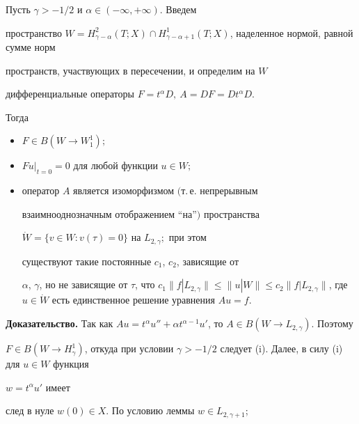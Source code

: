 \begin{lems}\label{AF}


Пусть $\gamma > -1/2$ и $\alpha \in (-\infty, + \infty)$. Введем


пространство  $W=H^2_{\gamma-\alpha}(T;X) \cap


H^1_{\gamma-\alpha+1}(T;X)$, наделенное нормой, равной сумме норм


пространств, участвующих в пересечении, и определим на $W$


дифференциальные операторы $F=t^\alpha D, \ A=DF=Dt^\alpha D$.


Тогда


\begin{itemize}


\item[(i)] $F \in B(W \to W_1^1);$


\item[(ii)]  ${Fu|}_{t=0}=0$ для любой функции $u \in W;$


\item[(iii)] оператор $A$ является изоморфизмом $($т.\,е. непрерывным


взаимнооднозначным отображением ``на''$)$ пространства


$\Dot{W}=\{v \in W: v(\tau)=0\}$ на $L_{2,\gamma};$ при этом


существуют такие постоянные $c_1$, $c_2$, зависящие от


$\alpha$, $\gamma$, но не зависящие от $\tau$, что $c_1


\|f|L_{2,\gamma}\| \le \|u|W\| \le c_2 \|f|L_{2,\gamma}\|$, где $u


\in \Dot{W}$ есть единственное решение уравнения $Au=f$.


\end{itemize}


\end{lems}








{\bf Доказательство.} Так как $A u = t^\alpha u'' + \alpha


t^{\alpha-1} u'$, то $A \in B(W{\to}L_{2,\gamma})$. Поэтому


$F \in B(W{\to}H_\gamma^1)$, откуда при условии $\gamma


> -1/2$ следует (i). Далее, в силу (i) для $u \in W$ функция


$w = t^\alpha u'$ имеет


след в нуле $w(0) \in X$. По условию леммы $w \in L_{2,\gamma+1}$;


